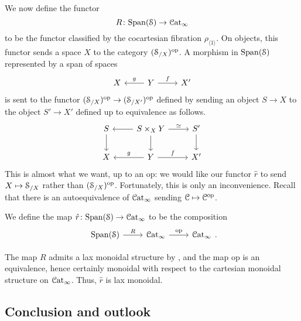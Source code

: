 \documentclass[main.tex]{subfiles}
\begin{document}
We now define the functor 
\begin{equation*}
  R\colon \Span(\S) \to \ICat
\end{equation*}
to be the functor classified by the cocartesian fibration $\rho_{\langle 1 \rangle}$. On objects, this functor sends a space $X$ to the category $(\S_{/X})\op$. A morphism in $\Span(\S)$ represented by a span of spaces
\begin{equation*}
  \begin{tikzcd}
    X
    & Y
    \arrow[l, swap, "g"]
    \arrow[r, "f"]
    & X'
  \end{tikzcd}
\end{equation*}
is sent to the functor $(\S_{/X})\op \to (\S_{/X'})\op$ defined by sending an object $S \to X$ to the object $S' \to X'$ defined up to equivalence as follows.
\begin{equation*}
  \begin{tikzcd}
    S
    \arrow[d]
    & S \times_{X} Y
    \arrow[l]
    \arrow[r, "\simeq"]
    \arrow[d]
    & S'
    \arrow[d]
    \\
    X
    & Y
    \arrow[l, swap, "g"]
    \arrow[r, "f"]
    & X'
  \end{tikzcd}
\end{equation*}
This is almost what we want, up to an $\mathrm{op}$: we would like our functor $\hat{r}$ to send $X \mapsto \S_{/X}$ rather than $(\S_{/X})\op$. Fortunately, this is only an inconvenience. Recall that there is an autoequivalence of $\ICat$ sending $\category{C} \mapsto \category{C}\op$.
\begin{definition}
  We define the map $\hat{r}\colon \Span(\S) \to \ICat$ to be the composition
  \begin{equation*}
    \begin{tikzcd}
      \Span(\S)
      \arrow[r, "R"]
      & \ICat
      \arrow[r, "\mathrm{op}"]
      & \ICat
    \end{tikzcd}.
  \end{equation*}
\end{definition}

The map $R$ admits a lax monoidal structure by \cite[2.4.2.4--2.4.2.6]{luriehigheralgebra}, and the map $\mathrm{op}$ is an equivalence, hence certainly monoidal with respect to the cartesian monoidal structure on $\ICat$. Thus, $\hat{r}$ is lax monoidal.

\subsection{Conclusion and outlook}
\label{ssc:conclusion}
\end{document}
